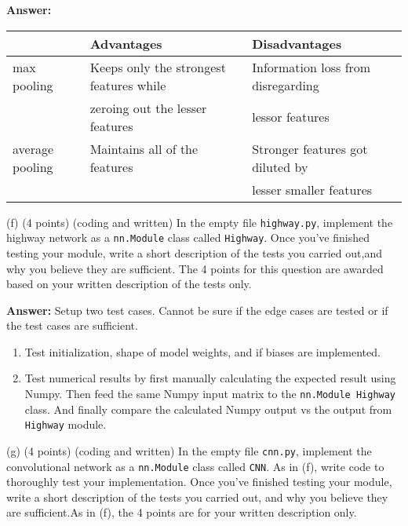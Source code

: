 \documentclass{article}
\begin{document}
\bigbreak
\noindent
\textbf{Answer:}
\begin{center}
    \begin{tabular}{ |l|l|l| } 
        \hline
        & \textbf{Advantages} & \textbf{Disadvantages} \\ 
        \hline
        max pooling & Keeps only the strongest features while & Information loss from disregarding \\
        & zeroing out the lesser features & lessor features \\
        \hline
        average pooling & Maintains all of the features &  Stronger features got diluted by \\
         & & lesser smaller features\\
        \hline
    \end{tabular}
\end{center}

\bigbreak
\bigbreak
\noindent
(f) (4 points) (coding and written)  In the empty file \verb|highway.py|, implement the highway network as a \verb|nn.Module| class called \verb|Highway|. Once you’ve finished testing your module, write a short description of the tests you carried out,and why you believe they are sufficient.  The 4 points for this question are awarded based on your written description of the tests only.

\bigbreak
\noindent
\textbf{Answer:} Setup two test cases. Cannot be sure if the edge cases are tested or if the test cases are sufficient.
\begin{enumerate}[1]
\item Test initialization, shape of model weights, and if biases are implemented.
\item Test numerical results by first manually calculating the expected result using Numpy. Then feed the same Numpy input matrix to the \verb|nn.Module Highway| class. And finally compare the calculated Numpy output vs the output from \verb|Highway| module.
\end{enumerate}


\bigbreak
\bigbreak
\noindent
(g) (4 points)  (coding and written) In the empty file \verb|cnn.py|, implement the convolutional network as a \verb|nn.Module| class called \verb|CNN|. As in (f),  write code to thoroughly test your implementation.  Once you’ve finished testing your module, write a short description of the tests you carried out, and why you believe they are sufficient.As in (f), the 4 points are for your written description only.
\end{document}
